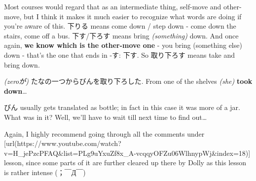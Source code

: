 Most courses would regard that as an intermediate thing, self-move and other-move, but I think it makes it much easier to recognize what words are doing if you're aware of this. 下りる means come down / step down - come down the stairs, come off a bus. 下す/下ろす means bring {\em (something)} down. And once again, {\bf we know which is the other-move one} - you bring (something else) down - that's the one that ends in -す: 下す. So 取り下ろす means take and bring down.

{}

{\em (zeroが)} たなの一つからびんを取り下ろした. From one of the shelves {\em (she)} {\bf took down}\ldots{}

びん usually gets translated as bottle; in fact in this case it was more of a jar. What was in it? Well, we'll have to wait till next time to find out\ldots{}

Again, I highly recommend going through all the comments under [url(https://www.youtube.com/watch?v=H_jePzcPFAQ&list=PLg9uYxuZf8x_A-vcqqyOFZu06WlhnypWj&index=18)] lesson, since some parts of it are further cleared up there by Dolly as this lesson is rather intense (；￣Д￣)

\stopsectionlevel

\stopsectionlevel
